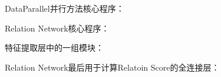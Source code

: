 DataParallel并行方法核心程序：
\begin{code}
    
\end{code}

Relation Network核心程序：
\begin{code}
    
\end{code}

特征提取层中的一组模块：
\begin{code}
    
\end{code}

Relation Network最后用于计算Relatoin Score的全连接层：
\begin{code}
    
\end{code}